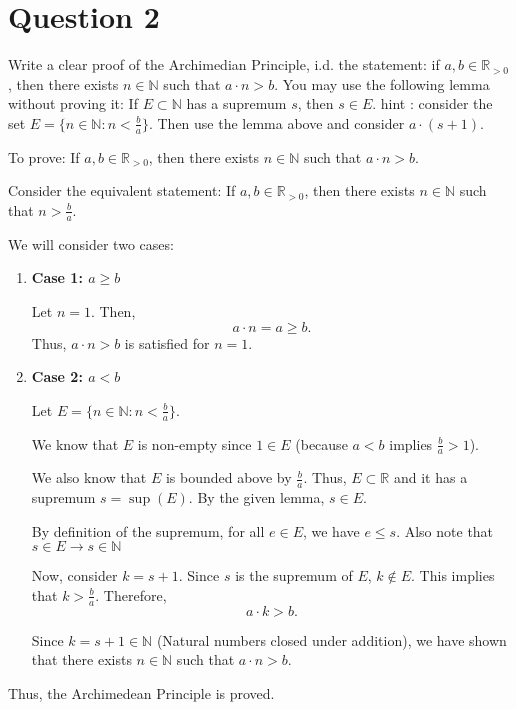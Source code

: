 \documentclass{article}
\begin{document}
\section{Question 2}
Write a clear proof of the Archimedian Principle, i.d. the statement: if $a, b \in \mathbb{R}_{>0}$, then there exists $n \in \mathbb{N}$ such that $a \cdot n > b$. You may use the following lemma without proving it: If $E \subset \mathbb{N}$ has a supremum $s$, then $s \in E$.
hint : consider the set $E = \{n \in \mathbb{N} : n < \frac{b}{a}\}$. Then use the lemma above and consider $a \cdot (s + 1)$.
\begin{proofbox}
    To prove: If \(a, b \in \mathbb{R}_{>0}\), then there exists \(n \in \mathbb{N}\) such that \(a \cdot n > b\).

Consider the equivalent statement: If \(a, b \in \mathbb{R}_{>0}\), then there exists \(n \in \mathbb{N}\) such that \(n > \frac{b}{a}\).

We will consider two cases:

\begin{enumerate}
    \item \textbf{Case 1: \(a \geq b\)}

    Let \(n = 1\). Then,
    \[
    a \cdot n = a \geq b.
    \]
    Thus, \(a \cdot n > b\) is satisfied for \(n = 1\).

    \item \textbf{Case 2: \(a < b\)}

    Let \(E = \{n \in \mathbb{N} : n < \frac{b}{a}\}\). 

    We know that \(E\) is non-empty since \(1 \in E\) (because \(a < b\) implies \(\frac{b}{a} > 1\)). 

    We also know that \(E\) is bounded above by \(\frac{b}{a}\). Thus, \(E \subset \mathbb{R}\) and it has a supremum \(s = \sup(E)\). By the given lemma, \(s \in E\).

    By definition of the supremum, for all \(e \in E\), we have \(e \leq s\). Also note that $s \in E \rightarrow s \in \mathbb{N}$

    Now, consider \(k = s + 1\). Since \(s\) is the supremum of \(E\), \(k \notin E\). This implies that \(k > \frac{b}{a}\). Therefore,
    \[
    a \cdot k > b.
    \]

    Since \(k = s + 1 \in \mathbb{N} \) (Natural numbers closed under addition), we have shown that there exists \(n \in \mathbb{N}\) such that \(a \cdot n > b\).
\end{enumerate}
Thus, the Archimedean Principle is proved.
    
\end{proofbox}
\end{document}
